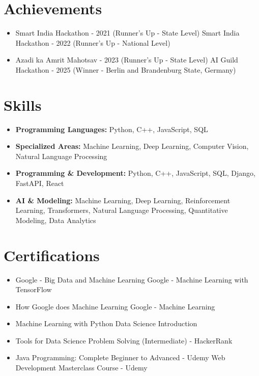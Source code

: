 \documentclass[a4paper,10pt]{article}
\begin{document}
\section*{Achievements}
\begin{itemize}
\item Smart India Hackathon - 2021 (Runner's Up - State Level) \hfill Smart India Hackathon - 2022 (Runner's Up - National Level)
\item Azadi ka Amrit Mahotsav - 2023 (Runner's Up - State Level) \hfill AI Guild Hackathon - 2025 (Winner - Berlin and Brandenburg State, Germany)
\end{itemize}

\section*{Skills}
\begin{itemize}
  \item \textbf{Programming Languages:} Python, C++, JavaScript, SQL
  \item \textbf{Specialized Areas:} Machine Learning, Deep Learning, Computer Vision, Natural Language Processing
  \item \textbf{Programming \& Development:} Python, C++, JavaScript, SQL, Django, FastAPI, React
  \item \textbf{AI \& Modeling:} Machine Learning, Deep Learning, Reinforcement Learning, Transformers, Natural Language Processing, Quantitative Modeling, Data Analytics
\end{itemize}

\section*{Certifications}
\begin{itemize}
\item Google - Big Data and Machine Learning \hfill Google - Machine Learning with TensorFlow
\item How Google does Machine Learning \hfill Google - Machine Learning
\item Machine Learning with Python \hfill Data Science Introduction
\item Tools for Data Science \hfill Problem Solving (Intermediate) - HackerRank
\item Java Programming: Complete Beginner to Advanced - Udemy \hfill Web Development Masterclass Course - Udemy
\end{itemize}
\end{document}
